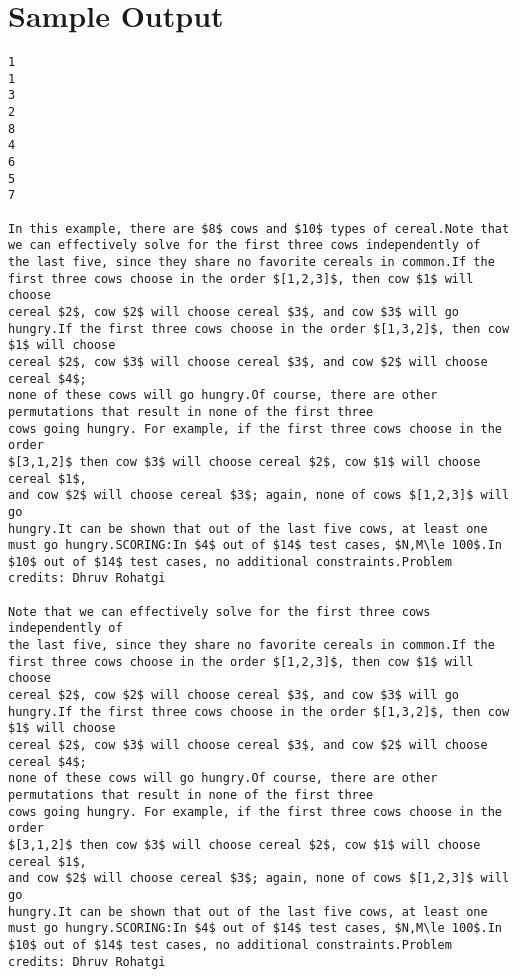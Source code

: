 \documentclass[12pt]{article}
\begin{document}
\section*{Sample Output}
\begin{verbatim}
1
1
3
2
8
4
6
5
7

In this example, there are $8$ cows and $10$ types of cereal.Note that we can effectively solve for the first three cows independently of 
the last five, since they share no favorite cereals in common.If the first three cows choose in the order $[1,2,3]$, then cow $1$ will choose
cereal $2$, cow $2$ will choose cereal $3$, and cow $3$ will go hungry.If the first three cows choose in the order $[1,3,2]$, then cow $1$ will choose
cereal $2$, cow $3$ will choose cereal $3$, and cow $2$ will choose cereal $4$;
none of these cows will go hungry.Of course, there are other permutations that result in none of the first three
cows going hungry. For example, if the first three cows choose in the order
$[3,1,2]$ then cow $3$ will choose cereal $2$, cow $1$ will choose cereal $1$,
and cow $2$ will choose cereal $3$; again, none of cows $[1,2,3]$ will go
hungry.It can be shown that out of the last five cows, at least one must go hungry.SCORING:In $4$ out of $14$ test cases, $N,M\le 100$.In $10$ out of $14$ test cases, no additional constraints.Problem credits: Dhruv Rohatgi

Note that we can effectively solve for the first three cows independently of 
the last five, since they share no favorite cereals in common.If the first three cows choose in the order $[1,2,3]$, then cow $1$ will choose
cereal $2$, cow $2$ will choose cereal $3$, and cow $3$ will go hungry.If the first three cows choose in the order $[1,3,2]$, then cow $1$ will choose
cereal $2$, cow $3$ will choose cereal $3$, and cow $2$ will choose cereal $4$;
none of these cows will go hungry.Of course, there are other permutations that result in none of the first three
cows going hungry. For example, if the first three cows choose in the order
$[3,1,2]$ then cow $3$ will choose cereal $2$, cow $1$ will choose cereal $1$,
and cow $2$ will choose cereal $3$; again, none of cows $[1,2,3]$ will go
hungry.It can be shown that out of the last five cows, at least one must go hungry.SCORING:In $4$ out of $14$ test cases, $N,M\le 100$.In $10$ out of $14$ test cases, no additional constraints.Problem credits: Dhruv Rohatgi


\end{verbatim}
\end{document}
